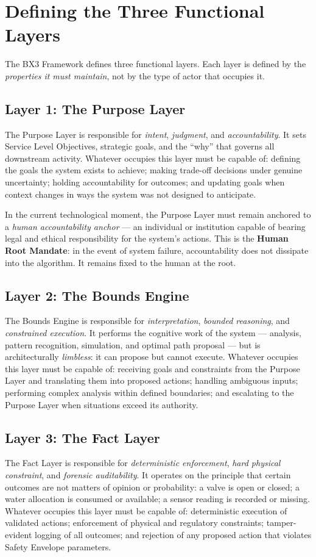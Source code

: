 \documentclass[12pt]{article}
\begin{document}
\section{Defining the Three Functional Layers}
\label{sec:layers}

The BX3 Framework defines three functional layers. Each layer is defined by the \textit{properties it must maintain}, not by the type of actor that occupies it.

\subsection{Layer 1: The Purpose Layer}
The Purpose Layer is responsible for \textit{intent}, \textit{judgment}, and \textit{accountability}. It sets Service Level Objectives, strategic goals, and the ``why'' that governs all downstream activity. Whatever occupies this layer must be capable of: defining the goals the system exists to achieve; making trade-off decisions under genuine uncertainty; holding accountability for outcomes; and updating goals when context changes in ways the system was not designed to anticipate.

In the current technological moment, the Purpose Layer must remain anchored to a \textit{human accountability anchor} --- an individual or institution capable of bearing legal and ethical responsibility for the system's actions. This is the \textbf{Human Root Mandate}: in the event of system failure, accountability does not dissipate into the algorithm. It remains fixed to the human at the root.

\subsection{Layer 2: The Bounds Engine}
The Bounds Engine is responsible for \textit{interpretation}, \textit{bounded reasoning}, and \textit{constrained execution}. It performs the cognitive work of the system --- analysis, pattern recognition, simulation, and optimal path proposal --- but is architecturally \textit{limbless}: it can propose but cannot execute. Whatever occupies this layer must be capable of: receiving goals and constraints from the Purpose Layer and translating them into proposed actions; handling ambiguous inputs; performing complex analysis within defined boundaries; and escalating to the Purpose Layer when situations exceed its authority.

\subsection{Layer 3: The Fact Layer}
The Fact Layer is responsible for \textit{deterministic enforcement}, \textit{hard physical constraint}, and \textit{forensic auditability}. It operates on the principle that certain outcomes are not matters of opinion or probability: a valve is open or closed; a water allocation is consumed or available; a sensor reading is recorded or missing. Whatever occupies this layer must be capable of: deterministic execution of validated actions; enforcement of physical and regulatory constraints; tamper-evident logging of all outcomes; and rejection of any proposed action that violates Safety Envelope parameters.
\end{document}
